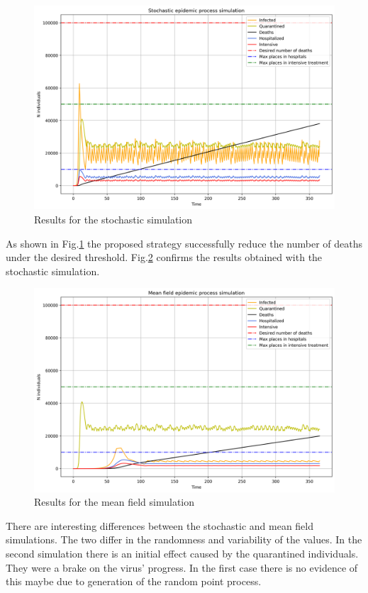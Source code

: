 \documentclass[conference]{IEEEtran}
\begin{document}
\begin{figure}[!ht]
    \centering
    \includegraphics[width=\columnwidth]{media/stochastic.png}
    \caption[short]{Results for the stochastic simulation}
    \label{fig:stochastic}
\end{figure}

As shown in Fig.\ref{fig:stochastic} the proposed strategy successfully reduce the number of deaths under the desired threshold. Fig.\ref{fig:mean_field} confirms the results obtained with the stochastic simulation. 

\begin{figure}[!ht]
    \centering
    \includegraphics[width=\columnwidth]{media/mean_field.png}
    \caption[short]{Results for the mean field simulation}
    \label{fig:mean_field}
\end{figure}

There are interesting differences between the stochastic and mean field simulations. 
%
The two differ in the randomness and variability of the values.
%
In the second simulation there is an initial effect caused by the quarantined individuals.
%
They were a brake on the virus' progress. 
%
In the first case there is no evidence of this maybe due to generation of the random point process. 

%
%
\end{document}
